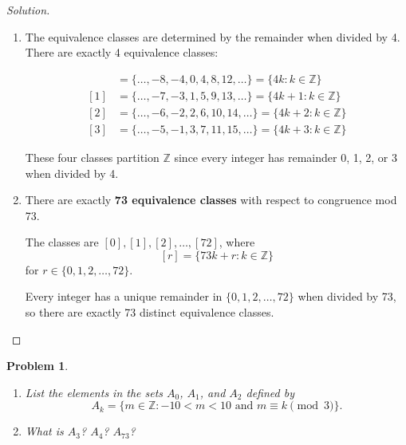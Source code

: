 \documentclass[12pt]{article}
\newtheorem{problem}{Problem}
\newcommand{\ZZ}{\ensuremath{\mathbb Z}}
\begin{document}
\begin{proof}[Solution]
~
\begin{enumerate}[label=(\alph*)]
    \item The equivalence classes are determined by the remainder when divided by 4. There are exactly 4 equivalence classes:
    
    \begin{align*}
    [0] &= \{\ldots, -8, -4, 0, 4, 8, 12, \ldots\} = \{4k : k \in \ZZ\} \\
    [1] &= \{\ldots, -7, -3, 1, 5, 9, 13, \ldots\} = \{4k + 1 : k \in \ZZ\} \\
    [2] &= \{\ldots, -6, -2, 2, 6, 10, 14, \ldots\} = \{4k + 2 : k \in \ZZ\} \\
    [3] &= \{\ldots, -5, -1, 3, 7, 11, 15, \ldots\} = \{4k + 3 : k \in \ZZ\}
    \end{align*}
    
    These four classes partition $\ZZ$ since every integer has remainder 0, 1, 2, or 3 when divided by 4.
    
    \item There are exactly \textbf{73 equivalence classes} with respect to congruence mod 73.
    
    The classes are $[0], [1], [2], \ldots, [72]$, where 
    $$[r] = \{73k + r : k \in \ZZ\}$$
    for $r \in \{0, 1, 2, \ldots, 72\}$.
    
    Every integer has a unique remainder in $\{0, 1, 2, \ldots, 72\}$ when divided by 73, so there are exactly 73 distinct equivalence classes.
\end{enumerate}
\end{proof}


\setcounter{problem}{7}
\begin{problem}
\begin{enumerate}[label=(\alph*)]
    \item List the elements in the sets $A_0$, $A_1$, and $A_2$ defined by
    $$A_k = \{m \in \ZZ : -10 < m < 10 \text{ and } m \equiv k \pmod{3}\}.$$
    
    \item What is $A_3$? $A_4$? $A_{73}$?
\end{enumerate}
\end{problem}
\end{document}
